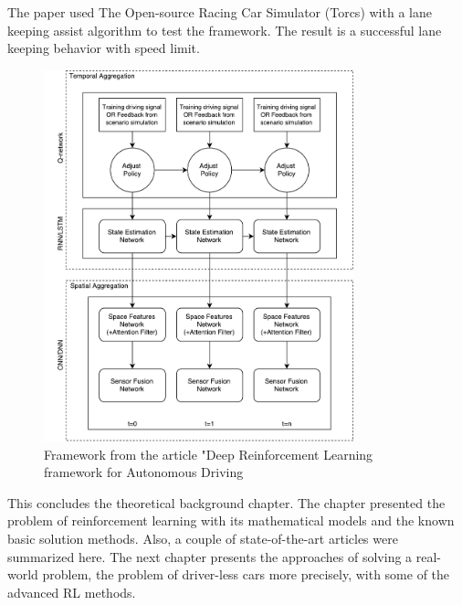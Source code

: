 The paper used The Open-source Racing Car Simulator (Torcs) with a lane keeping assist algorithm to test the framework. The result is a successful lane keeping behavior with speed limit.        

\begin{figure}[H]
	\centering
	\includegraphics[width=0.8\textwidth]{Figures/TheoreticalBackground/Framework_article}
	\caption{Framework from the article "Deep Reinforcement Learning framework for Autonomous Driving}
	\label{fig:Framework_article}
\end{figure}
 
This concludes the theoretical background chapter. The chapter presented the problem of reinforcement learning with its mathematical models and the known basic solution methods. Also, a couple of state-of-the-art articles were summarized here. The next chapter presents the approaches of solving a real-world problem, the problem of driver-less cars more precisely, with some of the advanced RL methods.